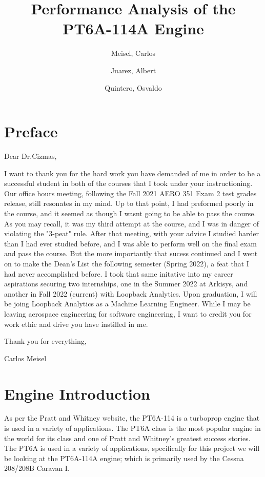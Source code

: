 \documentclass[titlepage]{article}
\author{
    Meisel, Carlos \\
  \and
  Juarez, Albert\\
  \and
    Quintero, Osvaldo\\
}
\title{Performance Analysis of the PT6A-114A Engine}
\begin{document}
  \maketitle

  \tableofcontents

  \vspace*{4cm}

    \section{Preface}

    Dear Dr.Cizmas,
    \vspace{0.5cm}

    I want to thank you for the hard work you have demanded of me in order to be a successful student in both of the courses that I took
    under your instructioning. Our office hours meeting, following the Fall 2021 AERO 351 Exam 2 test grades release, still resonates in my mind. 
    Up to that point, I had preformed poorly in the course, and it seemed as though I wasnt going to be able to pass the course. 
    As you may recall, it was my third attempt at the course, and I was in danger of violating the "3-peat" rule. After that meeting, with your advice
    I studied harder than I had ever studied before, and I was able to perform well on the final exam and pass the course. But the more 
    importantly that sucess continued and I went on to make the Dean's List the following semester (Spring 2022), a feat that I had never accomplished before.
    I took that same initative into my career aspirations securing two internships, one in the Summer 2022 at Arkisys, and another in Fall 2022 
    (current) with Loopback Analytics. Upon graduation, I will be joing Loopback Analytics as a Machine Learning Engineer. While I 
    may be leaving aerospace engineering for software engineering, I want to credit you for work ethic and drive you have instilled in me.

    \vspace{0.5cm}

    Thank you for everything, 

    Carlos Meisel


    \section{Engine Introduction}

    As per the Pratt and Whitney website, the PT6A-114 is a turboprop engine that is used in a variety of applications. 
    The PT6A class is the most popular engine in the world for its class and one of Pratt and Whitney's greatest success stories.
    The PT6A is used in a variety of applications, specifically for this project we will be looking at the PT6A-114A engine; which is 
    primarily used by the Cessna 208/208B Caravan I. 
\end{document}
